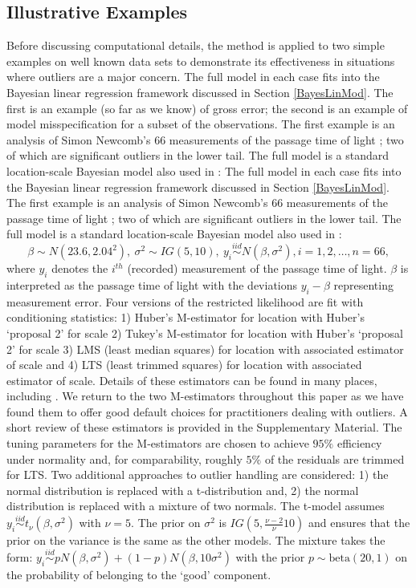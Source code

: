 \documentclass[ba]{imsart}
\newcommand{\iid}{\stackrel{iid}{\sim}}
\begin{document}
\subsection{Illustrative Examples}
\label{illustrations}
Before discussing computational details, the method is applied to two simple examples on well known data sets to demonstrate its effectiveness in situations where outliers are a major concern. The full model in each case fits into the Bayesian linear regression framework discussed in Section \ref{BayesLinMod}. The first is an example (so far as we know) of gross error; the second is an example of model misspecification for a subset of the observations.  The first example is an analysis of Simon Newcomb's 66 measurements of the passage time of light \citep{stigler1977}; two of which are significant outliers in the lower tail. The full model is a standard location-scale Bayesian model also used in \cite{lee2014}:
The full model in each case fits into the Bayesian linear regression framework discussed in Section \ref{BayesLinMod}. The first example is an analysis of Simon Newcomb's 66 measurements of the passage time of light \citep{stigler1977}; two of which are significant outliers in the lower tail. The full model is a standard location-scale Bayesian model also used in \cite{lee2014}:\begin{equation}
\beta\sim N(23.6, 2.04^{2}),\  \sigma^{2}\sim IG(5, 10), \ y_{i}\iid N (\beta, \sigma^{2}), i=1,2,\dots, n=66,
\end{equation}
where $y_{i}$ denotes the $i^{th}$ (recorded) measurement of the passage time of light. $\beta$ is interpreted as the passage time of light with the deviations $y_i - \beta$ representing measurement error.
Four versions of the restricted likelihood are fit with conditioning statistics: 1) Huber's M-estimator for location with Huber's `proposal 2'  for scale 2)  Tukey's M-estimator for location with Huber's `proposal 2'  for scale 3) LMS (least median squares) for location with associated estimator of scale and 4) LTS (least trimmed squares)  for location with associated estimator of scale. Details of these estimators can be found in many places, including \citep{huber2009}. We return to the two M-estimators throughout this paper as we have found them to offer good default choices for practitioners dealing with outliers. A short review of these estimators is provided in the Supplementary Material.  The tuning parameters for the M-estimators are chosen to achieve $95\%$ efficiency under normality \citep{huber2009} and, for comparability, roughly $5\%$ of the residuals are trimmed for LTS.  Two additional approaches to outlier handling are considered: 1) the normal distribution is replaced with a t-distribution and, 2) the normal distribution is replaced with a mixture of two normals. The t-model assumes $y_{i}\iid t_{\nu} (\beta, \sigma^{2})$ with $\nu=5$. The prior on $\sigma^{2}$ is $IG(5, \frac{\nu-2}{\nu}10)$ and ensures that the prior on the variance is the same as the other models. The mixture takes the form: $y_{i}\iid pN (\beta, \sigma^{2}) + (1-p)N(\beta, 10\sigma^{2})$ with the prior $p \sim \text{beta}(20,1)$ on the probability of belonging to the `good' component.  
\end{document}
